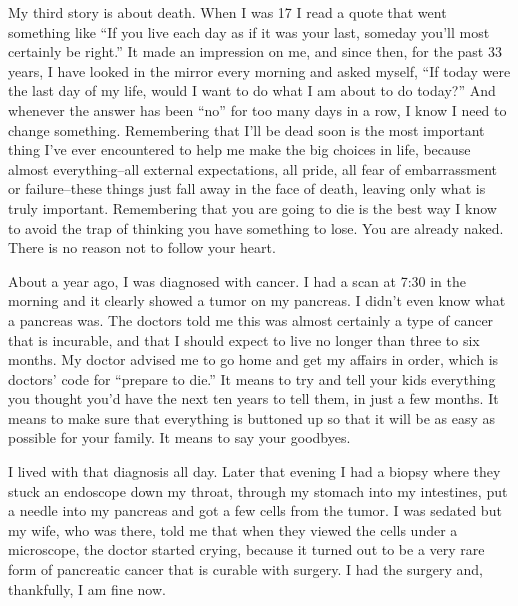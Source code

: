 \documentclass[12pt,a4paper,twocolumn]{article}
\begin{document}
My third story is about death. When I was 17 I read a quote that went something like ``If you live each day as if it was
your last, someday you'll most certainly be right.'' It made an impression on me, and since then, for the past 33 years, I
have looked in the mirror every morning and asked myself, ``If today were the last day of my life, would I want to do what I
am about to do today?'' And whenever the answer has been ``no'' for too many days in a row, I know I need to change
something. Remembering that I'll be dead soon is the most important thing I've ever encountered to help me make the big
choices in life, because almost everything--all external expectations, all pride, all fear of embarrassment or
failure--these things just fall away in the face of death, leaving only what is truly important. Remembering that you are
going to die is the best way I know to avoid the trap of thinking you have something to lose. You are already naked. There
is no reason not to follow your heart.

About a year ago, I was diagnosed with cancer. I had a scan at 7:30 in the morning and it clearly showed a tumor on my
pancreas. I didn't even know what a pancreas was. The doctors told me this was almost certainly a type of cancer that is
incurable, and that I should expect to live no longer than three to six months. My doctor advised me to go home and get my
affairs in order, which is doctors' code for ``prepare to die.'' It means to try and tell your kids everything you thought
you'd have the next ten years to tell them, in just a few months. It means to make sure that everything is buttoned up so
that it will be as easy as possible for your family. It means to say your goodbyes.

I lived with that diagnosis all day. Later that evening I had a biopsy where they stuck an endoscope down my throat, through
my stomach into my intestines, put a needle into my pancreas and got a few cells from the tumor. I was sedated but my wife,
who was there, told me that when they viewed the cells under a microscope, the doctor started crying, because it turned out
to be a very rare form of pancreatic cancer that is curable with surgery. I had the surgery and, thankfully, I am fine now.
\end{document}
